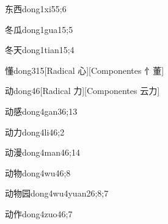 \begin{verbete}{东西}{dong1xi5}{5;6}
\end{verbete}

\begin{verbete}{冬瓜}{dong1gua1}{5;5}
\end{verbete}

\begin{verbete}{冬天}{dong1tian1}{5;4}
\end{verbete}

\begin{verbete}{懂}{dong3}{15}[Radical 心][Componentes ⺖董]
\end{verbete}

\begin{verbete}{动}{dong4}{6}[Radical 力][Componentes 云力]
\end{verbete}

\begin{verbete}{动感}{dong4gan3}{6;13}
\end{verbete}

\begin{verbete}{动力}{dong4li4}{6;2}
\end{verbete}

\begin{verbete}{动漫}{dong4man4}{6;14}
\end{verbete}

\begin{verbete}{动物}{dong4wu4}{6;8}
\end{verbete}

\begin{verbete}{动物园}{dong4wu4yuan2}{6;8;7}
\end{verbete}

\begin{verbete}{动作}{dong4zuo4}{6;7}
\end{verbete}

